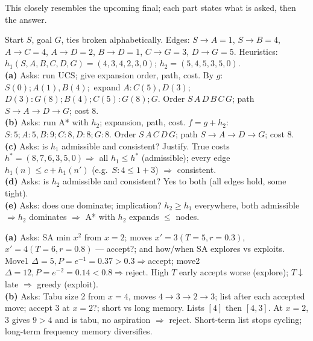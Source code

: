 This closely resembles the upcoming final; each part states what is asked, then the answer.

Start \(S\), goal \(G\), ties broken alphabetically. Edges: \(S\!\to\!A{=}1\), \(S\!\to\!B{=}4\), \(A\!\to\!C{=}4\), \(A\!\to\!D{=}2\), \(B\!\to\!D{=}1\), \(C\!\to\!G{=}3\), \(D\!\to\!G{=}5\).
Heuristics: \(h_1(S,A,B,C,D,G)=(4,3,4,2,3,0)\); \(h_2=(5,4,5,3,5,0)\).\\
\textbf{(a)} Asks: run UCS; give expansion order, path, cost. By \(g\): \(S(0);A(1),B(4);\) expand \(A\!:C(5),D(3);\) \(D(3)\!:G(8);B(4);C(5)\!:G(8);G\). Order \(S\,A\,D\,B\,C\,G\); path \(S\!\to\!A\!\to\!D\!\to\!G\); cost \(8\).\\
\textbf{(b)} Asks: run A* with \(h_2\); expansion, path, cost. \(f{=}g{+}h_2\): \(S{:}5;A{:}5,B{:}9;C{:}8,D{:}8;G{:}8\). Order \(S\,A\,C\,D\,G\); path \(S\!\to\!A\!\to\!D\!\to\!G\); cost \(8\).\\
\textbf{(c)} Asks: is \(h_1\) admissible and consistent? Justify. True costs \(h^*=(8,7,6,3,5,0)\Rightarrow\) all \(h_1\le h^*\) (admissible); every edge \(h_1(n)\le c+h_1(n')\) (e.g.\ \(S{:}4\le1{+}3\)) \(\Rightarrow\) consistent.\\
\textbf{(d)} Asks: is \(h_2\) admissible and consistent? Yes to both (all edges hold, some tight).\\
\textbf{(e)} Asks: does one dominate; implication? \(h_2\ge h_1\) everywhere, both admissible \(\Rightarrow h_2\) dominates \(\Rightarrow\) A* with \(h_2\) expands \(\le\) nodes.

\textbf{(a)} Asks: SA min \(x^2\) from \(x{=}2\); moves \(x'{=}3(T{=}5,r{=}0.3)\), \(x'{=}4(T{=}6,r{=}0.8)\) --- accept?; and how/when SA explores vs exploits. Move1 \(\Delta{=}5,P{=}e^{-1}{=}0.37{>}0.3\Rightarrow\)accept; move2 \(\Delta{=}12,P{=}e^{-2}{=}0.14{<}0.8\Rightarrow\)reject. High \(T\) early accepts worse (explore); \(T\downarrow\) late \(\Rightarrow\) greedy (exploit).\\
\textbf{(b)} Asks: Tabu size 2 from \(x{=}4\), moves \(4\!\to\!3\!\to\!2\!\to\!3\); list after each accepted move; accept \(3\) at \(x{=}2\)?; short vs long memory. Lists \([4]\) then \([4,3]\). At \(x{=}2\), \(3\) gives \(9{>}4\) and is tabu, no aspiration \(\Rightarrow\) reject. Short-term list stops cycling; long-term frequency memory diversifies.

